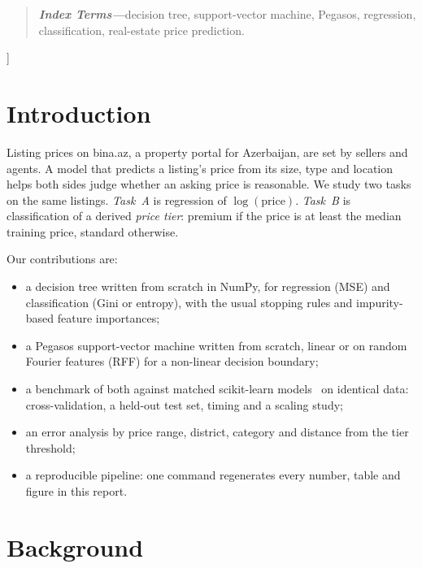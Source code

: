 \documentclass[10pt,twocolumn,a4paper]{article}
\newcommand{\abstractkw}[1]{\noindent\textbf{\textit{#1}}}
\begin{document}
\begin{@twocolumnfalse}
\begin{quote}
    \vspace{0.6em}
    \abstractkw{Index Terms---}decision tree, support-vector machine,
    Pegasos, regression, classification, real-estate price prediction.
  \end{quote}
  \vspace{1.0em}
  \end{@twocolumnfalse}
]

\section{Introduction}
Listing prices on bina.az, a property portal for Azerbaijan, are set by
sellers and agents. A model
that predicts a listing's price from its size, type and location helps
both sides judge whether an asking price is reasonable. We study two tasks
on the same listings. \emph{Task~A} is regression of $\log(\text{price})$.
\emph{Task~B} is classification of a derived \emph{price tier}: premium
if the price is at least the median training price, standard otherwise.

Our contributions are:
\begin{itemize}
  \item a decision tree written from scratch in NumPy, for regression (MSE)
  and classification (Gini or entropy), with the usual stopping rules and
  impurity-based feature importances;
  \item a Pegasos support-vector machine written from scratch, linear or on
  random Fourier features (RFF) for a non-linear decision boundary;
  \item a benchmark of both against matched scikit-learn
  models~\cite{sklearn} on identical data: cross-validation, a held-out
  test set, timing and a scaling study;
  \item an error analysis by price range, district, category and distance
  from the tier threshold;
  \item a reproducible pipeline: one command regenerates every number,
  table and figure in this report.
\end{itemize}

\section{Background}
\label{sec:background}
\end{document}
